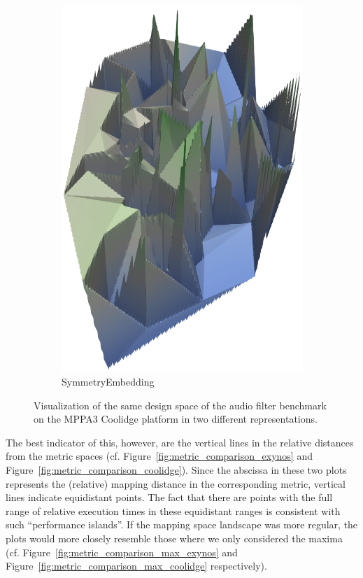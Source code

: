 \begin{figure}[t]
\begin{subfigure}[b]{0.43\textwidth}
    \includegraphics[width=\textwidth]{figures/coolidge-af-space-emb-sym.png}
		\caption{SymmetryEmbedding}
	\end{subfigure}

	\caption{Visualization of the same design space of the audio filter benchmark on the MPPA3 Coolidge platform in two different representations.}%
	\label{fig:visualization_simpvec_symemb}
\end{figure}


The best indicator of this, however, are the vertical lines in the relative distances from the metric spaces (cf. Figure~\ref{fig:metric_comparison_exynos} and Figure~\ref{fig:metric_comparison_coolidge}).
Since the abscissa in these two plots represents the (relative) mapping distance in the corresponding metric, vertical lines indicate equidistant points. 
The fact that there are points with the full range of relative execution times in these equidistant ranges is consistent with such ``performance islands''.
If the mapping space landscape was more regular, the plots would more closely resemble those where we only considered the maxima (cf. Figure~\ref{fig:metric_comparison_max_exynos} and Figure~\ref{fig:metric_comparison_max_coolidge} respectively).

